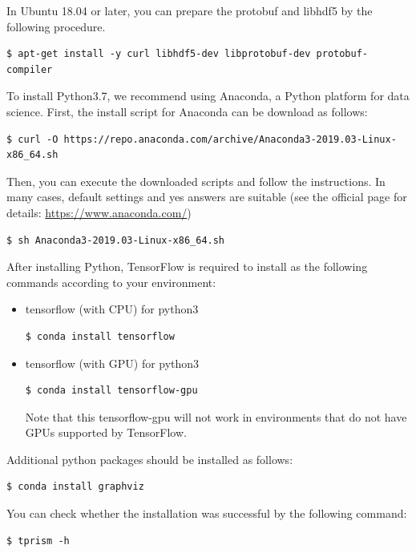 \documentclass[a4paper]{report}
\begin{document}
In Ubuntu 18.04 or later, you can prepare the protobuf and libhdf5 by the following procedure.
\begin{verbatim}
$ apt-get install -y curl libhdf5-dev libprotobuf-dev protobuf-compiler 
\end{verbatim}

To install Python3.7, we recommend using Anaconda, a Python platform for data science.
First, the install script for Anaconda can be download as follows: 
\begin{verbatim}
$ curl -O https://repo.anaconda.com/archive/Anaconda3-2019.03-Linux-x86_64.sh
\end{verbatim}

Then, you can execute the downloaded scripts and follow the instructions. In many cases, default settings and yes answers are suitable (see the official page for details: \url{https://www.anaconda.com/})

\begin{verbatim}
$ sh Anaconda3-2019.03-Linux-x86_64.sh
\end{verbatim}

After installing Python, TensorFlow is required to install as the following commands according to your environment:
\begin{itemize}
	\item tensorflow (with CPU) for python3
	\begin{verbatim}
$ conda install tensorflow
	\end{verbatim}
	\item  tensorflow (with GPU) for python3
	\begin{verbatim}
$ conda install tensorflow-gpu
	\end{verbatim}
	Note that this tensorflow-gpu will not work in environments that do not have GPUs supported by TensorFlow.
\end{itemize}
Additional python packages should be installed as follows:
\begin{verbatim}
$ conda install graphviz
\end{verbatim}

You can check whether the installation was successful by the following command:
\begin{verbatim}
$ tprism -h
\end{verbatim}
\end{document}
